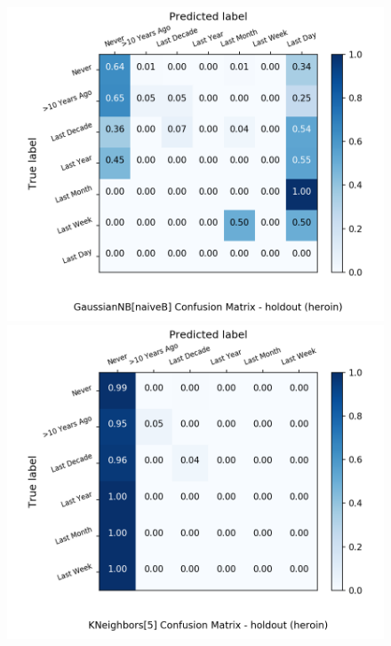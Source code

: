\begin{figure}[H]
	\begin{minipage}[b]{0.32\textwidth}
		\includegraphics[width=1.1\textwidth]{Plots/drugs/heroin_GaussianNB_naiveB_balance_False_holdout.png}
	\end{minipage}
	\begin{minipage}[b]{0.32\textwidth}
		\includegraphics[width=1.1\textwidth]{Plots/drugs/heroin_KNeighbors_5_balance_False_holdout.png}
  \end{minipage}
	\begin{minipage}[b]{0.32\textwidth}

\end{minipage}
\end{figure}
